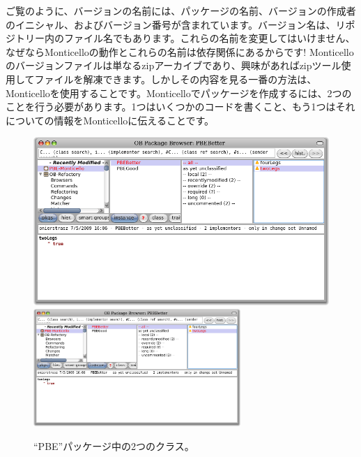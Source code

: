 \documentclass[a4paper,10pt,twoside]{book}
\begin{document}
ご覧のように、バージョンの名前には、パッケージの名前、バージョンの作成者のイニシャル、およびバージョン番号が含まれています。バージョン名は、リポジトリー内のファイル名でもあります。これらの名前を変更してはいけません、なぜならMonticelloの動作とこれらの名前は依存関係にあるからです! Monticelloのバージョンファイルは単なるzipアーカイブであり、興味があればzipツール使用してファイルを解凍できます。しかしその内容を見る一番の方法は、Monticelloを使用することです。Monticelloでパッケージを作成するには、2つのことを行う必要があります。1つはいくつかのコードを書くこと、もう1つはそれについての情報をMonticelloに伝えることです。


\begin{figure}[btp]
	\begin{center}
	\ifluluelse
		{\includegraphics[width=\textwidth]{MCnewcategory}}
		{\includegraphics[width=0.7\textwidth]{MCnewcategory}}
	\end{center}
	\caption{``PBE''パッケージ中の2つのクラス。}
\end{figure}
\end{document}
